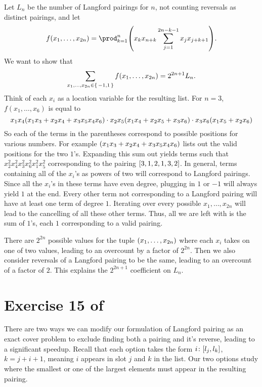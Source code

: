 \documentclass[letterpaper]{article}
\begin{document}
Let $L_{n}$ be the number of Langford pairings for $n$, not counting reversals as distinct pairings, and let
\[
    f(x_{1}, \ldots, x_{2n}) = \prod_{k = 1}^{n} \pqty{x_{k} x_{n+k} \sum_{j = 1}^{2n - k - 1} x_{j} x_{j+k+1}}.
\]
We want to show that
\[
    \sum_{x_{1}, \ldots, x_{2n} \in \set{-1, 1}} f(x_{1}, \ldots, x_{2n}) = 2^{2n + 1} L_{n}.
\]
Think of each $x_{i}$ as a location variable for the resulting list. For $n = 3$, $f(x_{1}, \ldots, x_{6})$ is equal to
\[
    x_{1} x_{4} \pqty{x_{1} x_{3} + x_{2} x_{4} + x_{3} x_{5} x_{4} x_{6}} \cdot x_{2} x_{5} \pqty{x_{1} x_{4} + x_{2} x_{5} + x_{3} x_{6}} \cdot x_{3} x_{6} \pqty{x_{1} x_{5} + x_{2} x_{6}}
\]
So each of the terms in the parentheses correspond to possible positions for various numbers.
For example $\pqty{x_{1} x_{3} + x_{2} x_{4} + x_{3} x_{5} x_{4} x_{6}}$ lists out the valid positions for the two $1$'s.
Expanding this sum out yields terms such that $x_{2}^{2} x_{4}^{2} x_{3}^{2} x_{6}^{2} x_{1}^{2} x_{5}^{2}$ corresponding to the pairing $\bqty{3, 1, 2, 1, 3, 2}$.
In general, terms containing all of the $x_{i}$'s as powers of two will correspond to Langford pairings.
Since all the $x_{i}$'s in these terms have even degree, plugging in $1$ or $-1$ will always yield $1$ at the end.
Every other term not corresponding to a Langford pairing will have at least one term of degree $1$.
Iterating over every possible $x_{1}, \ldots, x_{2n}$ will lead to the cancelling of all these other terms.
Thus, all we are left with is the sum of $1$'s, each $1$ corresponding to a valid pairing.

There are $2^{2n}$ possible values for the tuple $\pqty{x_{1}, \ldots, x_{2n}}$ where each $x_{i}$ takes on one of two values, leading to an overcount by a factor of $2^{2n}$.
Then we also consider reversals of a Langford pairing to be the same, leading to an overcount of a factor of $2$.
This explains the $2^{2n + 1}$ coefficient on $L_{n}$.


\section*{Exercise 15 of \cite[Chapter~7.2.2.1]{TAOCP4B}}

There are two ways we can modify our formulation of Langford pairing as an exact cover problem to exclude finding both a pairing and it's reverse, leading to a significant speedup.
Recall that each option takes the form $i\colon \bqty{l_{j}, l_{k}}$, $k = j + i + 1$, meaning $i$ appears in slot $j$ and $k$ in the list.
Our two options study where the smallest or one of the largest elements must appear in the resulting pairing.
\end{document}
